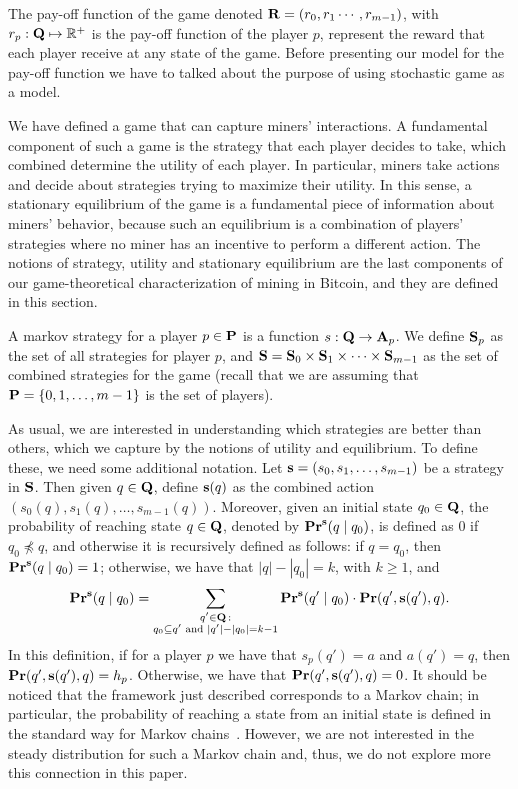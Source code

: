 The pay-off function of the game denoted $\mathbf{R} = (r_0,r_1 \cdots, r_{m-1})$, with $r_p : \mathbf{Q} \mapsto \mathbb{R^+}$ is the pay-off function of the player $p$, represent the reward that each player receive at any state of the game. Before presenting our model for the pay-off function we have to talked about the purpose of using stochastic game as a model.

We have defined a game that can capture miners' interactions. A fundamental component of such a game is the strategy that each player decides to take, which combined determine the utility of each player. In particular, miners take actions and decide about strategies trying to maximize their utility. In this sense, a stationary equilibrium of the game is a fundamental piece of information about miners' behavior, because such an equilibrium is a combination of players' strategies where no miner has an incentive to perform a different action. The notions of strategy, utility and stationary equilibrium are the last components of our game-theoretical characterization of mining in Bitcoin, and they are defined in this section.

A markov strategy for a player $p \in \mathbf{P}$ is a function $s : \mathbf{Q} \rightarrow \mathbf{A}_p$.
We define $\mathbf{S}_p$ as the set of all strategies for player $p$, and $\mathbf{S} = \mathbf{S}_0 \times \mathbf{S}_{1} \times \cdots \times \mathbf{S}_{m-1}$ as the set of combined strategies for the game (recall that we are assuming that $\mathbf{P} = \{0, 1, \ldots, m-1\}$ is the set of players).

As usual, we are interested in understanding which strategies are better than others, which we capture by the notions of  utility and equilibrium. To define these, we need some additional notation.
Let $\mathbf{s} = (s_0, s_1, \ldots, s_{m-1})$ be a strategy in $\mathbf{S}$. Then given $q \in \mathbf{Q}$, define $\mathbf{s}(q)$ as the combined action $(s_0(q), s_1(q), \ldots, s_{m-1}(q))$. Moreover, given an initial state $q_0 \in \mathbf{Q}$,
the probability of reaching state $q \in \mathbf{Q}$, denoted by $\mathbf{Pr}^{\mathbf{s}}(q \mid q_0)$, is defined as 0 if $q_0 \not\preceq q$, and otherwise it is recursively defined as follows: if $q =  q_0$, then $\mathbf{Pr}^{\mathbf{s}}(q \mid q_0) = 1$; otherwise, we have that $|q| - |q_0| = k$, with $k \geq 1$, and
$$
\mathbf{Pr}^{\mathbf{s}}(q \mid q_0) =
\sum_{\substack{q' \in \mathbf{Q} \,:\\ q_0 \subseteq q' \text{ and } |q'| - |q_0| = k-1}}
 \mathbf{Pr}^{\mathbf{s}}(q' \mid q_0) \cdot \mathbf{Pr}(q', \mathbf{s}(q'), q).
 $$
In this definition, if for a player $p$ we have that $s_p(q') = a$ and $a(q') = q$, then $\mathbf{Pr}(q', \mathbf{s}(q'), q) = h_p$. Otherwise, we have that $\mathbf{Pr}(q', \mathbf{s}(q'), q) = 0$.
It should be noticed that the framework just described corresponds to a Markov chain; in particular, the probability of reaching a state from an initial state is defined in the standard way for Markov chains~\cite{MU05}. However, we are not interested in the steady distribution for such a Markov chain and, thus, we do not explore more this connection in this paper.

